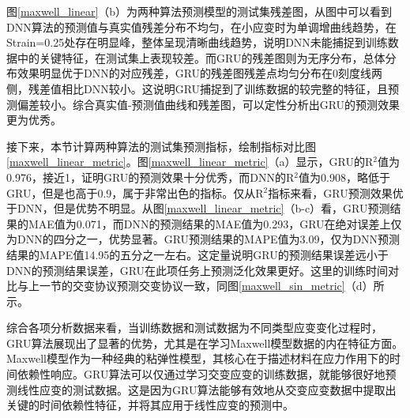 图\ref{maxwell_linear}（b）为两种算法预测模型的测试集残差图，从图中可以看到DNN算法的预测值与真实值残差分布不均匀，在小应变时为单调增曲线趋势，在Strain=0.25处存在明显峰，整体呈现清晰曲线趋势，说明DNN未能捕捉到训练数据中的关键特征，在测试集上表现较差。而GRU的残差图则为无序分布，总体分布效果明显优于DNN的对应残差，GRU的残差图残差点均匀分布在0刻度线两侧，残差值相比DNN较小。这说明GRU捕捉到了训练数据的较完整的特征，且预测偏差较小。综合真实值-预测值曲线和残差图，可以定性分析出GRU的预测效果更为优秀。

接下来，本节计算两种算法的测试集预测指标，绘制指标对比图\ref{maxwell_linear_metric}。图\ref{maxwell_linear_metric}（a）显示，GRU的R$^2$值为0.976，接近1，证明GRU的预测效果十分优秀，而DNN的R$^2$值为0.908，略低于GRU，但是也高于0.9，属于非常出色的指标。仅从R$^2$指标来看，GRU预测效果优于DNN，但是优势不明显。从图\ref{maxwell_linear_metric}（b-c）看，GRU预测结果的MAE值为0.071，而DNN的预测结果的MAE值为0.293，GRU在绝对误差上仅为DNN的四分之一，优势显著。GRU预测结果的MAPE值为3.09，仅为DNN预测结果的MAPE值14.95的五分之一左右。这定量说明GRU的预测结果误差远小于DNN的预测结果误差，GRU在此项任务上预测泛化效果更好。这里的训练时间对比与上一节的交变协议预测交变协议一致，同图\ref{maxwell_sin_metric}（d）所示。


综合各项分析数据来看，当训练数据和测试数据为不同类型应变变化过程时，GRU算法展现出了显著的优势，尤其是在学习Maxwell模型数据的内在特征方面。Maxwell模型作为一种经典的粘弹性模型，其核心在于描述材料在应力作用下的时间依赖性响应。GRU算法可以仅通过学习交变应变的训练数据，就能够很好地预测线性应变的测试数据。这是因为GRU算法能够有效地从交变应变数据中提取出关键的时间依赖性特征，并将其应用于线性应变的预测中。
